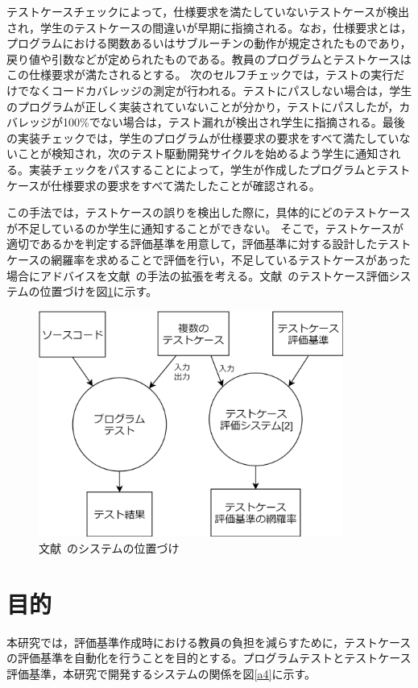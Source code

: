 \documentclass{tpu-sotu}
\begin{document}
テストケースチェックによって，仕様要求を満たしていないテストケースが検出され，学生のテストケースの間違いが早期に指摘される。なお，仕様要求とは，プログラムにおける関数あるいはサブルーチンの動作が規定されたものであり，戻り値や引数などが定められたものである。教員のプログラムとテストケースはこの仕様要求が満たされるとする。
次のセルフチェックでは，テストの実行だけでなくコードカバレッジの測定が行われる。テストにパスしない場合は，学生のプログラムが正しく実装されていないことが分かり，テストにパスしたが，カバレッジが100\%でない場合は，テスト漏れが検出され学生に指摘される。最後の実装チェックでは，学生のプログラムが仕様要求の要求をすべて満たしていないことが検知され，次のテスト駆動開発サイクルを始めるよう学生に通知される。実装チェックをパスすることによって，学生が作成したプログラムとテストケースが仕様要求の要求をすべて満たしたことが確認される。

この手法では，テストケースの誤りを検出した際に，具体的にどのテストケースが不足しているのか学生に通知することができない。
そこで，テストケースが適切であるかを判定する評価基準を用意して，評価基準に対する設計したテストケースの網羅率を求めることで評価を行い，不足しているテストケースがあった場合にアドバイスを文献~\cite{a1}の手法の拡張を考える。文献~\cite{a1}のテストケース評価システムの位置づけを図\ref{a3}に示す。

\begin{figure}[h]
  \centering
  \includegraphics[width=100mm]{文献[2]のシステムの位置づけ.png}
  \caption{文献~\cite{a1}のシステムの位置づけ}
  \label{a3}
\end{figure}

\section{目的}
本研究では，評価基準作成時における教員の負担を減らすために，テストケースの評価基準を自動化を行うことを目的とする。プログラムテストとテストケース評価基準，本研究で開発するシステムの関係を図\ref{a4}に示す。
\end{document}
